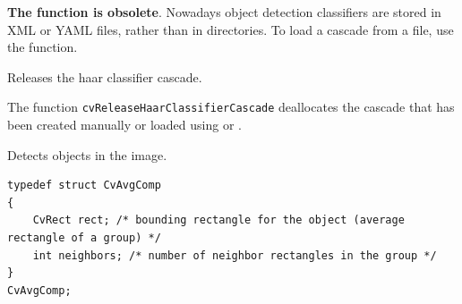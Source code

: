 \textbf{The function is obsolete}. Nowadays object detection classifiers are stored in XML or YAML files, rather than in directories. To load a cascade from a file, use the  function.

\label{ReleaseHaarClassifierCascade}

Releases the haar classifier cascade.


\begin{description}
\end{description}

The function \texttt{cvReleaseHaarClassifierCascade} deallocates the cascade that has been created manually or loaded using  or .

\label{HaarDetectObjects}

Detects objects in the image.

\begin{lstlisting}
typedef struct CvAvgComp
{
    CvRect rect; /* bounding rectangle for the object (average rectangle of a group) */
    int neighbors; /* number of neighbor rectangles in the group */
}
CvAvgComp;
\end{lstlisting}

\fi


